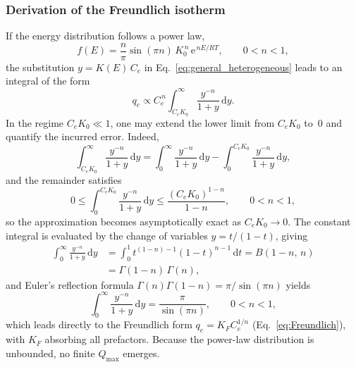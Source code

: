 \documentclass[12pt]{article}
\begin{document}
	\subsubsection{Derivation of the Freundlich isotherm}

	If the energy distribution follows a power law,
	\begin{equation}
		f(E) = \frac{n}{\pi}\sin(\pi n)\,
		K_0^{\,n}\, \mathrm{e}^{\,nE/RT},
		\qquad 0 < n < 1,
	\end{equation}
	the substitution $y = K(E)\,C_e$ in Eq.~\eqref{eq:general_heterogeneous}
	leads to an integral of the form
	\begin{equation}
		q_e \propto C_e^{\,n}
		\int_{C_e K_0}^{\infty} \frac{y^{-n}}{1 + y}\,\mathrm{d}y.
		\label{eq:freundlich_derivation_step}
	\end{equation}
	In the regime $C_e K_0 \ll 1$, one may extend the lower limit from
	$C_e K_0$ to~$0$ and quantify the incurred error. Indeed,
	\begin{equation}
		\int_{C_e K_0}^{\infty} \frac{y^{-n}}{1+y}\, \mathrm{d}y
		=
		\int_{0}^{\infty} \frac{y^{-n}}{1+y}\, \mathrm{d}y
		-
		\int_{0}^{C_e K_0} \frac{y^{-n}}{1+y}\, \mathrm{d}y,
	\end{equation}
	and the remainder satisfies
	\begin{equation}
		0 \le \int_{0}^{C_e K_0} \frac{y^{-n}}{1+y}\, \mathrm{d}y
		\le \frac{(C_e K_0)^{1-n}}{1-n},
		\qquad 0<n<1,
	\end{equation}
	so the approximation becomes asymptotically exact as $C_e K_0 \to 0$.
	The constant integral is evaluated by the change of variables
	$y = t/(1-t)$, giving
	\begin{align}
		\int_{0}^{\infty} \frac{y^{-n}}{1+y}\, \mathrm{d}y
		&= \int_{0}^{1} t^{(1-n)-1}(1-t)^{n-1}\, \mathrm{d}t
		= B(1-n,\,n) \nonumber\\
		&= \Gamma(1-n)\,\Gamma(n),
		\label{eq:beta_integral_gamma}
	\end{align}
	and Euler's reflection formula $\Gamma(n)\Gamma(1-n) = \pi/\sin(\pi n)$
	yields
	\begin{equation}
		\int_{0}^{\infty} \frac{y^{-n}}{1+y}\, \mathrm{d}y
		= \frac{\pi}{\sin(\pi n)}, \qquad 0<n<1,
		\label{eq:beta_integral}
	\end{equation}
	which leads directly to the Freundlich form
	$q_e = K_F C_e^{1/n}$ (Eq.~\eqref{eq:Freundlich}),
	with $K_F$ absorbing all prefactors. Because the power-law distribution
	is unbounded, no finite $Q_{\max}$ emerges.
\end{document}

